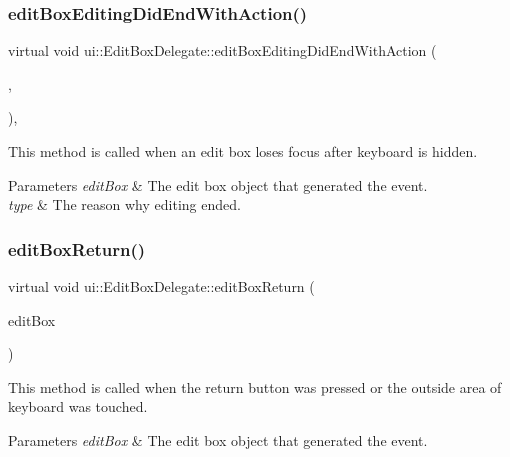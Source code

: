 \subsubsection{\texorpdfstring{edit\+Box\+Editing\+Did\+End\+With\+Action()}{editBoxEditingDidEndWithAction()}}
{\footnotesize\ttfamily virtual void ui\+::\+Edit\+Box\+Delegate\+::edit\+Box\+Editing\+Did\+End\+With\+Action (\begin{DoxyParamCaption}\item[{\hyperlink{classui_1_1EditBox}{Edit\+Box} $\ast$}]{,  }\item[{\hyperlink{classui_1_1EditBoxDelegate_ae7285a0cdbe2f2daf0557c97dba0bdb5}{Edit\+Box\+End\+Action}}]{ }\end{DoxyParamCaption})\hspace{0.3cm}{\ttfamily [inline]}, {\ttfamily [virtual]}}

This method is called when an edit box loses focus after keyboard is hidden. 
\begin{DoxyParams}{Parameters}
{\em edit\+Box} & The edit box object that generated the event. \\
\hline
{\em type} & The reason why editing ended. \\
\hline
\end{DoxyParams}
\mbox{\label{classui_1_1EditBoxDelegate_acf0e70504509694fb0b73b5e517669c6}} 
\subsubsection{\texorpdfstring{edit\+Box\+Return()}{editBoxReturn()}\hspace{0.1cm}{\footnotesize\ttfamily [1/2]}}
{\footnotesize\ttfamily virtual void ui\+::\+Edit\+Box\+Delegate\+::edit\+Box\+Return (\begin{DoxyParamCaption}\item[{\hyperlink{classui_1_1EditBox}{Edit\+Box} $\ast$}]{edit\+Box }\end{DoxyParamCaption})\hspace{0.3cm}{\ttfamily [pure virtual]}}

This method is called when the return button was pressed or the outside area of keyboard was touched. 
\begin{DoxyParams}{Parameters}
{\em edit\+Box} & The edit box object that generated the event. \\
\hline
\end{DoxyParams}
\mbox{\label{classui_1_1EditBoxDelegate_acf0e70504509694fb0b73b5e517669c6}} 
